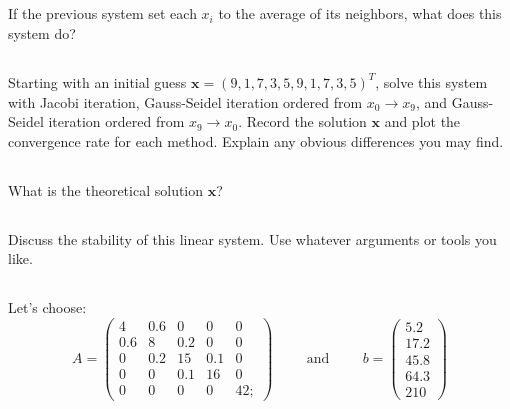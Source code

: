 \subsection{} If the previous system set each $x_i$ to the average of its neighbors, what does this system do?

\subsection{} Starting with an initial guess $\mathbf{x}=(9,1,7,3,5,9,1,7,3,5)^T$, solve this system with Jacobi iteration, Gauss-Seidel iteration ordered from $x_0 \to x_9$, and Gauss-Seidel iteration ordered from $x_9 \to x_0$. Record the solution $\mathbf{x}$ and plot the convergence rate for each method. Explain any obvious differences you may find.

\subsection{} What is the theoretical solution $\mathbf{x}$? 

\subsection{} Discuss the stability of this linear system. Use whatever arguments or tools you like.

\iffalse
\subsection{} 

\subsection{} Let's choose:
$$ A = 
\left(\begin{matrix}
4& 0.6& 0& 0& 0\\
      0.6& 8& 0.2 & 0& 0\\
      0& 0.2& 15& 0.1& 0\\
    0& 0& 0.1& 16& 0\\
    0& 0& 0& 0& 42;

\end{matrix} \right)\hspace{1cm} \text{and} \hspace{1cm}
b = \left(\begin{matrix}
5.2\\
17.2\\
45.8\\
64.3\\
210
\end{matrix} \right)
$$

